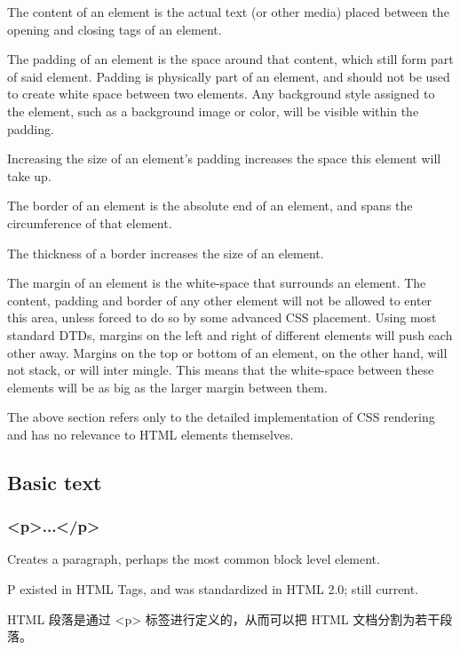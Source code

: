 \begin{compactitem}
\item The content of an element is the actual text (or other media) placed between the opening and closing tags of an element.
\item The padding of an element is the space around that content, which still form part of said element. Padding is physically part of an element, and should not be used to create white space between two elements. Any background style assigned to the element, such as a background image or color, will be visible within the padding. \item Increasing the size of an element's padding increases the space this element will take up.
\item The border of an element is the absolute end of an element, and spans the circumference of that element. \item The thickness of a border increases the size of an element.
\item The margin of an element is the white-space that surrounds an element. The content, padding and border of any other element will not be allowed to enter this area, unless forced to do so by some advanced CSS placement. Using most standard DTDs, margins on the left and right of different elements will push each other away. Margins on the top or bottom of an element, on the other hand, will not stack, or will inter mingle. This means that the white-space between these elements will be as big as the larger margin between them.
\end{compactitem}

The above section refers only to the detailed implementation of CSS rendering and has no relevance to HTML elements themselves.



\subsection{Basic text}



\subsubsection{<p>...</p>}

Creates a paragraph, perhaps the most common block level element.

P existed in HTML Tags, and was standardized in HTML 2.0; still current.

HTML 段落是通过 <p> 标签进行定义的，从而可以把 HTML 文档分割为若干段落。

